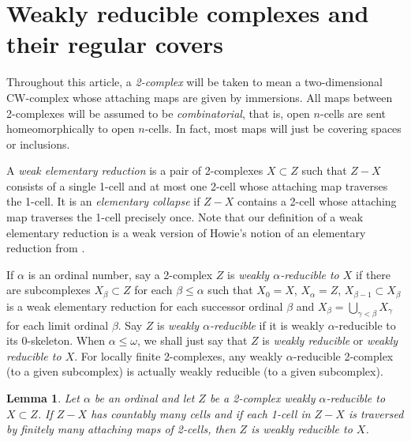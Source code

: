 \documentclass{amsart}
\newtheorem{lemma}[theorem]{Lemma}
\theoremstyle{definition}
\begin{document}
\section{Weakly reducible complexes and their regular covers}

Throughout this article, a \emph{2-complex} will be taken to mean a two-dimensional CW-complex whose attaching maps are given by immersions. All maps between 2-complexes will be assumed to be \emph{combinatorial}, that is, open $n$-cells are sent homeomorphically to open $n$-cells. In fact, most maps will just be covering spaces or inclusions.

A \emph{weak elementary reduction} is a pair of 2-complexes $X\subset Z$ such that $Z - X$ consists of a single 1-cell and at most one 2-cell whose attaching map traverses the 1-cell. It is an \emph{elementary collapse} if $Z - X$ contains a 2-cell whose attaching map traverses the 1-cell precisely once. Note that our definition of a weak elementary reduction is a weak version of Howie's notion of an elementary reduction from \cite{Ho82}.

If $\alpha$ is an ordinal number, say a 2-complex $Z$ is \emph{weakly $\alpha$-reducible to $X$} if there are subcomplexes $X_{\beta}\subset Z$ for each $\beta\leqslant\alpha$ such that $X_0 = X$, $X_{\alpha} = Z$, $X_{\beta-1}\subset X_{\beta}$ is a weak elementary reduction for each successor ordinal $\beta$ and $X_{\beta} = \bigcup_{\gamma<\beta}X_{\gamma}$ for each limit ordinal $\beta$. Say $Z$ is \emph{weakly $\alpha$-reducible} if it is weakly $\alpha$-reducible to its 0-skeleton. When $\alpha \leqslant \omega$, we shall just say that $Z$ is \emph{weakly reducible} or \emph{weakly reducible to $X$}. For locally finite 2-complexes, any weakly $\alpha$-reducible 2-complex (to a given subcomplex) is actually weakly reducible (to a given subcomplex).

\begin{lemma}
\label{reshuffle}
Let $\alpha$ be an ordinal and let $Z$ be a 2-complex weakly $\alpha$-reducible to $X\subset Z$. If $Z - X$ has countably many cells and if each 1-cell in $Z-X$ is traversed by finitely many attaching maps of 2-cells, then $Z$ is weakly reducible to $X$.
\end{lemma}
\end{document}
